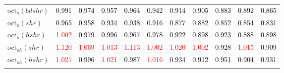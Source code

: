 \begin{tabular}[t]{l|>{}cccc>{}c|ccccc}
oct$_o(bdshr)$ & \textcolor{black}{0.991} & \textcolor{black}{0.974} & \textcolor{black}{0.957} & \textcolor{black}{0.964} & \textcolor{black}{0.942} & \textcolor{black}{0.914} & \textcolor{black}{0.905} & \textcolor{black}{0.883} & \textcolor{black}{0.892} & \textcolor{black}{0.865}\\
oct$_o(shr)$ & \textcolor{black}{0.965} & \textcolor{black}{0.958} & \textcolor{black}{0.934} & \textcolor{black}{0.938} & \textcolor{black}{0.916} & \textcolor{black}{0.877} & \textcolor{black}{0.882} & \textcolor{black}{0.852} & \textcolor{black}{0.854} & \textcolor{black}{0.831}\\
oct$_o(hshr)$ & \textcolor{red}{1.002} & \textcolor{black}{0.979} & \textcolor{black}{0.996} & \textcolor{black}{0.967} & \textcolor{black}{0.978} & \textcolor{black}{0.922} & \textcolor{black}{0.898} & \textcolor{black}{0.923} & \textcolor{black}{0.888} & \textcolor{black}{0.898}\\
oct$_{oh}(shr)$ & \textcolor{red}{1.120} & \textcolor{red}{1.069} & \textcolor{red}{1.013} & \textcolor{red}{1.113} & \textcolor{red}{1.002} & \textcolor{red}{1.020} & \textcolor{red}{1.002} & \textcolor{black}{0.928} & \textcolor{red}{1.015} & \textcolor{black}{0.909}\\
oct$_{oh}(hshr)$ & \textcolor{red}{1.021} & \textcolor{black}{0.996} & \textcolor{red}{1.021} & \textcolor{black}{0.987} & \textcolor{red}{1.016} & \textcolor{black}{0.934} & \textcolor{black}{0.912} & \textcolor{black}{0.951} & \textcolor{black}{0.904} & \textcolor{black}{0.931}\\
\bottomrule
{}\\
\end{tabular}
